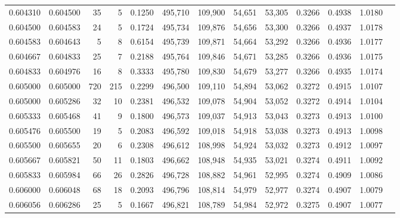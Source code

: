 \begin{tabular}{rrrrrrrrrrrrr}
0.604310 & 0.604500 &    35 &   5 &                                     0.1250 & 495,710 & 109,900 &  54,651 &  53,305 & 0.3266 & 0.4938 & 1.0180 \\
0.604500 & 0.604583 &    24 &   5 &                                     0.1724 & 495,734 & 109,876 &  54,656 &  53,300 & 0.3266 & 0.4937 & 1.0178 \\
0.604583 & 0.604643 &     5 &   8 &                                     0.6154 & 495,739 & 109,871 &  54,664 &  53,292 & 0.3266 & 0.4936 & 1.0177 \\
0.604667 & 0.604833 &    25 &   7 &                                     0.2188 & 495,764 & 109,846 &  54,671 &  53,285 & 0.3266 & 0.4936 & 1.0175 \\
0.604833 & 0.604976 &    16 &   8 &                                     0.3333 & 495,780 & 109,830 &  54,679 &  53,277 & 0.3266 & 0.4935 & 1.0174 \\
0.605000 & 0.605000 &   720 & 215 &                                     0.2299 & 496,500 & 109,110 &  54,894 &  53,062 & 0.3272 & 0.4915 & 1.0107 \\
0.605000 & 0.605286 &    32 &  10 &                                     0.2381 & 496,532 & 109,078 &  54,904 &  53,052 & 0.3272 & 0.4914 & 1.0104 \\
0.605333 & 0.605468 &    41 &   9 &                                     0.1800 & 496,573 & 109,037 &  54,913 &  53,043 & 0.3273 & 0.4913 & 1.0100 \\
0.605476 & 0.605500 &    19 &   5 &                                     0.2083 & 496,592 & 109,018 &  54,918 &  53,038 & 0.3273 & 0.4913 & 1.0098 \\
0.605500 & 0.605655 &    20 &   6 &                                     0.2308 & 496,612 & 108,998 &  54,924 &  53,032 & 0.3273 & 0.4912 & 1.0097 \\
0.605667 & 0.605821 &    50 &  11 &                                     0.1803 & 496,662 & 108,948 &  54,935 &  53,021 & 0.3274 & 0.4911 & 1.0092 \\
0.605833 & 0.605984 &    66 &  26 &                                     0.2826 & 496,728 & 108,882 &  54,961 &  52,995 & 0.3274 & 0.4909 & 1.0086 \\
0.606000 & 0.606048 &    68 &  18 &                                     0.2093 & 496,796 & 108,814 &  54,979 &  52,977 & 0.3274 & 0.4907 & 1.0079 \\
0.606056 & 0.606286 &    25 &   5 &                                     0.1667 & 496,821 & 108,789 &  54,984 &  52,972 & 0.3275 & 0.4907 & 1.0077 \\

\end{tabular}

